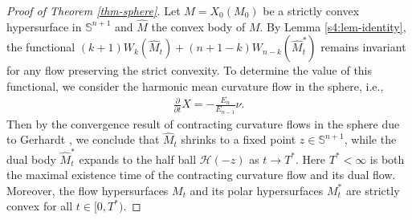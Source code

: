 \documentclass[11pt,reqno]{amsart}
\theoremstyle{definition}
\theoremstyle{remark}
\numberwithin{equation}{section}
\renewcommand{\(}{\left(}
\renewcommand{\)}{\right)}
\renewcommand{\~}{\tilde}
\renewcommand{\-}{\overline}
\newcommand{\ra}{\rightarrow}
\begin{document}
\begin{proof}[Proof of Theorem \ref{thm-sphere}]
	Let $M=X_0(M_0)$ be a strictly convex hypersurface in $\mathbb S^{n+1}$ and $\hat{M}$ the convex body of $M$. By Lemma \ref{s4:lem-identity}, the functional $(k+1)W_k(\hat{M}_t)+(n+1-k)W_{n-k}(\hat{M}_t^\ast)$ remains invariant for any flow preserving the strict convexity. To determine the value of this functional, we consider the harmonic mean curvature flow in the sphere, i.e., 
	\begin{align*}
	\frac{\partial}{\partial t}X=-\frac{E_{n}}{E_{n-1}}\nu.
	\end{align*}
	Then by the convergence result of contracting curvature flows in the sphere due to Gerhardt \cite{Ge15}, we conclude that $\hat{M}_t$ shrinks to a fixed point $z\in \mathbb S^{n+1}$, while the dual body $\hat{M}^\ast_t$ expands to the half ball $\mathcal{H}(-z)$ as $t\ra T^\ast$. Here $T^\ast<\infty$ is both the maximal existence time of the contracting curvature flow and its dual flow. Moreover, the flow hypersurfaces $M_t$ and its polar hypersurfaces $M^\ast_t$ are strictly convex for all $t\in [0,T^\ast)$.
	

\end{proof}
\end{document}
